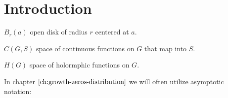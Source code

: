 \chapter{Introduction}
\label{ch:introduction}




$B_r(a)$ open disk of radius $r$ centered at $a$.

$C(G, S)$ space of continuous functions on $G$ that map into $S$.

$H(G)$ space of holormphic functions on $G$.

In chapter $\ref{ch:growth-zeros-distribution}$ we will often utilize asymptotic notation:

